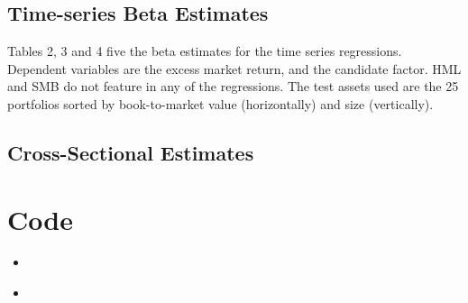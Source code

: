 \documentclass[12pt]{article}
\newcommand{\insertcode}[2]{\begin{itemize}\item[]\end{itemize}} %
\begin{document}
\subsection{Time-series Beta Estimates}

Tables 2, 3 and 4 five the beta estimates for the time series regressions. Dependent variables are the excess market return, and the candidate factor. HML and SMB do not feature in any of the regressions. The test assets used are the 25 portfolios sorted by book-to-market value (horizontally) and size (vertically). 




\newpage


%
% 
% 
%
% 
% 

%
% 




\subsection{Cross-Sectional Estimates}




\newpage




\section{Code}
\insertcode{"innovation.r"}{R Code.}
\insertcode{"innov.do"}{Stata Code.}
\end{document}
